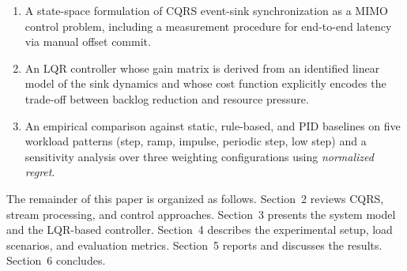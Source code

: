 \begin{enumerate}
    \item A state-space formulation of CQRS event-sink synchronization as a MIMO control problem, including a measurement procedure for end-to-end latency via manual offset commit.
    \item An LQR controller whose gain matrix is derived from an identified linear model of the sink dynamics and whose cost function explicitly encodes the trade-off between backlog reduction and resource pressure.
    \item An empirical comparison against static, rule-based, and PID baselines on five workload patterns (step, ramp, impulse, periodic step, low step) and a sensitivity analysis over three weighting configurations using \textit{normalized regret}.
\end{enumerate}

The remainder of this paper is organized as follows. Section~2 reviews CQRS, stream processing, and control approaches. Section~3 presents the system model and the LQR-based controller. Section~4 describes the experimental setup, load scenarios, and evaluation metrics. Section~5 reports and discusses the results. Section~6 concludes.
